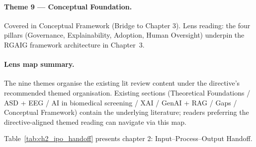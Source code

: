 \paragraph{Theme 9 --- Conceptual Foundation.} Covered in Conceptual Framework (Bridge to Chapter 3). Lens reading: the four pillars (Governance, Explainability, Adoption, Human Oversight) underpin the RGAIG framework architecture in Chapter~3.

\paragraph{Lens map summary.} The nine themes organise the existing lit review content under the directive's recommended themed organisation. Existing sections (Theoretical Foundations / ASD + EEG / AI in biomedical screening / XAI / GenAI + RAG / Gaps / Conceptual Framework) contain the underlying literature; readers preferring the directive-aligned themed reading can navigate via this map.

\noindent Table~\ref{tab:ch2_ipo_handoff} presents chapter 2: Input--Process--Output Handoff.


